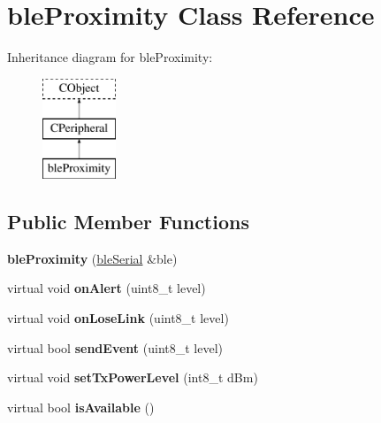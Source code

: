 \hypertarget{classble_proximity}{\section{ble\-Proximity Class Reference}
\label{classble_proximity}
}
Inheritance diagram for ble\-Proximity\-:\begin{figure}[H]
\begin{center}
\leavevmode
\includegraphics[height=3.000000cm]{classble_proximity}
\end{center}
\end{figure}
\subsection*{Public Member Functions}
\begin{DoxyCompactItemize}
\item 
\hypertarget{classble_proximity_a3cbf3bd31cac77037d623ef9c8098a71}{{\bfseries ble\-Proximity} (\hyperlink{classble_serial}{ble\-Serial} \&ble)}\label{classble_proximity_a3cbf3bd31cac77037d623ef9c8098a71}

\item 
\hypertarget{classble_proximity_a43c9187ddcb7237099ff414b74c5b0bd}{virtual void {\bfseries on\-Alert} (uint8\-\_\-t level)}\label{classble_proximity_a43c9187ddcb7237099ff414b74c5b0bd}

\item 
\hypertarget{classble_proximity_ad4032dad648f66e65762c26a199918ce}{virtual void {\bfseries on\-Lose\-Link} (uint8\-\_\-t level)}\label{classble_proximity_ad4032dad648f66e65762c26a199918ce}

\item 
\hypertarget{classble_proximity_a6d3426d21b9182c5b3e135dd783e097d}{virtual bool {\bfseries send\-Event} (uint8\-\_\-t level)}\label{classble_proximity_a6d3426d21b9182c5b3e135dd783e097d}

\item 
\hypertarget{classble_proximity_a177463a01974a439c9f8d90b36cf15e1}{virtual void {\bfseries set\-Tx\-Power\-Level} (int8\-\_\-t d\-Bm)}\label{classble_proximity_a177463a01974a439c9f8d90b36cf15e1}

\item 
\hypertarget{classble_proximity_adc2ab90789ee61d11031ce816b3db11c}{virtual bool {\bfseries is\-Available} ()}\label{classble_proximity_adc2ab90789ee61d11031ce816b3db11c}

\end{DoxyCompactItemize}
